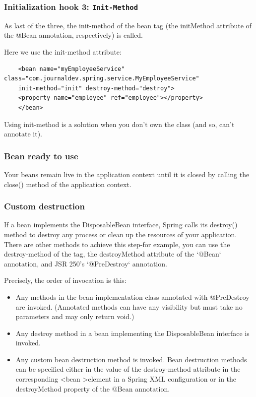 \documentclass{scrartcl}
\begin{document}
\subsubsection{Initialization hook 3: \lstinline|Init-Method|}
As last of the three, the init-method of the bean tag (the initMethod attribute of the @Bean annotation, respectively) is called.

Here we use the init-method attribute:

\begin{lstlisting}
    <bean name="myEmployeeService" class="com.journaldev.spring.service.MyEmployeeService"
    init-method="init" destroy-method="destroy">
    <property name="employee" ref="employee"></property>
    </bean>
\end{lstlisting}

Using init-method is a solution when you don't own the class (and so, can't annotate it).

\subsubsection{Bean ready to use}
Your beans remain live in the application context until it is closed by calling the close() method of the application context.

\subsubsection{Custom destruction}
If a bean implements the DisposableBean interface, Spring calls its destroy() method to destroy any process or clean up the resources of your application. There are other methods to achieve this step-for example, you can use the destroy-method of the tag, the destroyMethod attribute of the `@Bean` annotation, and JSR 250's `@PreDestroy` annotation.

Precisely, the order of invocation is this:

\begin{itemize}
    \item Any methods in the bean implementation class annotated with @PreDestroy are invoked. (Annotated methods can have any visibility but must take no parameters and may only return void.)
    \item Any destroy method in a bean implementing the DisposableBean interface is invoked.
    \item Any custom bean destruction method is invoked. Bean destruction methods can be specified either in the value of the destroy-method attribute in the corresponding \textless bean \textgreater element in a Spring XML configuration or in the destroyMethod property of the @Bean annotation.
\end{itemize}
\end{document}
